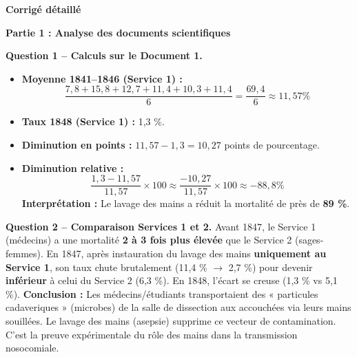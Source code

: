 \documentclass[11pt]{article}
\begin{document}
\begin{exoresolu}
\tcblower

\textbf{Corrigé détaillé}

\textbf{Partie 1 : Analyse des documents scientifiques}

\textbf{Question 1 -- Calculs sur le Document 1.}
\begin{itemize}
    \item \textbf{Moyenne 1841--1846 (Service 1) :}
    \[
    \frac{7,8 + 15,8 + 12,7 + 11,4 + 10,3 + 11,4}{6} = \frac{69,4}{6} \approx 11,57 \%
    \]
    \item \textbf{Taux 1848 (Service 1) :} 1,3 \%.
    \item \textbf{Diminution en points :} $11,57 - 1,3 = 10,27$ points de pourcentage.
    \item \textbf{Diminution relative :}
    \[
    \frac{1,3 - 11,57}{11,57} \times 100 \approx \frac{-10,27}{11,57} \times 100 \approx -88,8 \%
    \]
    \textbf{Interprétation :} Le lavage des mains a réduit la mortalité de près de \textbf{89 \%}.
\end{itemize}

\textbf{Question 2 -- Comparaison Services 1 et 2.}
Avant 1847, le Service 1 (médecins) a une mortalité \textbf{2 à 3 fois plus élevée} que le Service 2 (sages-femmes). En 1847, après instauration du lavage des mains \textbf{uniquement au Service 1}, son taux chute brutalement (11,4 \% $\to$ 2,7 \%) pour devenir \textbf{inférieur} à celui du Service 2 (6,3 \%). En 1848, l'écart se creuse (1,3 \% vs 5,1 \%).
\textbf{Conclusion :} Les médecins/étudiants transportaient des « particules cadaveriques » (microbes) de la salle de dissection aux accouchées via leurs mains souillées. Le lavage des mains (asepsie) supprime ce vecteur de contamination. C'est la preuve expérimentale du rôle des mains dans la transmission nosocomiale.


\end{exoresolu}
\end{document}
